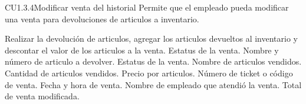 \begin{UseCase} {CU1.3.4}{Modificar venta del historial}{
	Permite que el empleado pueda modificar una venta para devoluciones de articulos a inventario.
}








	
	{
	}
	{
		Realizar la devolución de articulos, agregar los articulos devueltos al inventario y descontar el valor de los articulos a la venta.
	}
	{
		\UCli Estatus de la venta.
		\UCli Nombre y número de articulo a devolver.
	}
	{
		\UCli Estatus de la venta.
		\UCli Nombre de articulos vendidos.
		\UCli Cantidad de articulos vendidos.
		\UCli Precio por articulos.
		\UCli Número de ticket o código de venta.
		\UCli Fecha y hora de venta.
		\UCli Nombre de empleado que atendió la venta.
		\UCli Total de venta modificada.
	}


\end{UseCase}

